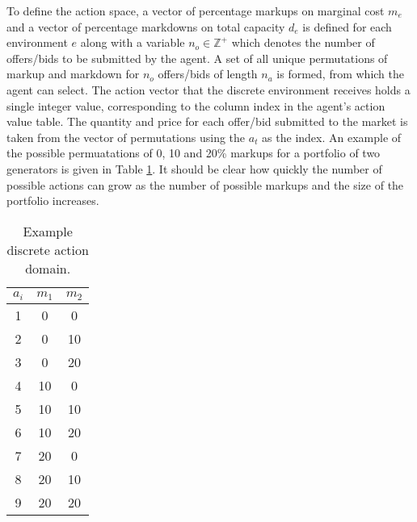 To define the action space, a vector of percentage markups on marginal cost
$m_e$ and a vector of percentage markdowns on total capacity $d_e$ is defined
for each environment $e$ along with a variable $n_o \in \mathbb{Z}^+$ which
denotes the number of offers/bids to be submitted by the agent.  A set of all
unique permutations of markup and markdown for $n_o$ offers/bids of length
$n_a$ is formed, from which the agent can select.  The action vector that the
discrete environment receives holds a single integer value, corresponding to
the column index in the agent's action value table.  The quantity and price for
each offer/bid submitted to the market is taken from the vector of permutations
using the $a_t$ as the index.  An example of the possible permuatations of 0,
10 and 20\% markups for a portfolio of two generators is given in Table
\ref{tbl:example_actions}.  It should be clear how quickly the number of
possible actions can grow as the number of possible markups and the size of the
portfolio increases.

\begin{table}
\begin{center}
\begin{tabular}{c|c|c}
\hline
$a_i$ &$m_1$ &$m_2$ \\
\hline\hline
 1 &0 &0 \\
 2 &0 &10 \\
 3 &0 &20 \\
 4 &10 &0 \\
 5 &10 &10 \\
 6 &10 &20 \\
 7 &20 &0 \\
 8 &20 &10 \\
 9 &20 &20 \\
\hline
\end{tabular}
\caption{Example discrete action domain.}
\label{tbl:example_actions}
\end{center}
\end{table}

